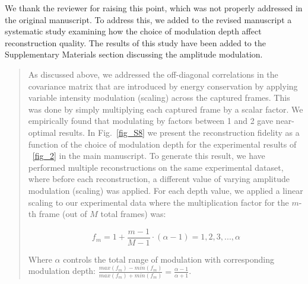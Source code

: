 \documentclass[12pt]{article}
\newenvironment{ourresponse}
    {\begin{tcolorbox}[width=\linewidth,breakable,enhanced,colback=gray!5,colframe=responsecolor!50,title=Response,left=5pt,right=5pt]}
    {\end{tcolorbox}}
\begin{document}
\begin{ourresponse}
We thank the reviewer for raising this point, which was not properly addressed in the original manuscript. To address this, we added to the revised manuscript a systematic study examining how the choice of modulation depth affect reconstruction quality. The results of this study have been added to the Supplementary Materials section discussing the amplitude modulation.



\begin{quote}

As discussed above, we addressed the off-diagonal correlations in the covariance matrix that are introduced by energy conservation by applying variable intensity modulation (scaling) across the captured frames. This was done by simply multiplying each captured frame by a scalar factor. We empirically found that modulating by factors between 1 and 2 gave near-optimal results. In Fig.~\ref{fig_S8} we present the reconstruction fidelity as a function of the choice of modulation depth for the experimental results of ~\ref{fig_2} in the main manuscript. To generate this result, we have performed multiple reconstructions on the same experimental dataset, where before each reconstruction, a different value of varying amplitude modulation (scaling) was applied. For each depth value, we applied a linear scaling to our experimental data where the multiplication factor for the $m$-th frame (out of $M$ total frames) was:


\begin{equation}
    f_m = 1 + \frac{m-1}{M-1} \cdot (\alpha -1) = 1, 2, 3, ..., \alpha
\end{equation}

Where $\alpha$ controls the total range of modulation with corresponding modulation depth: $\frac{max(f_m)-min(f_m)}{max(f_m)+min(f_m)}=\frac{\alpha-1}{\alpha+1}$.

\end{quote}
\end{ourresponse}
\end{document}
